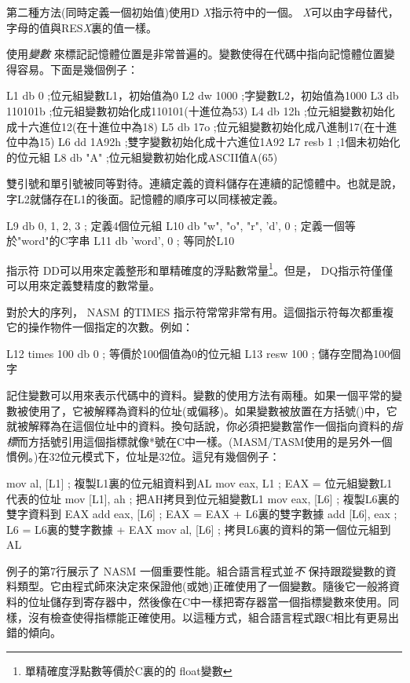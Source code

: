 第二種方法(同時定義一個初始值)使用{\code D{\em
X}}指示符中的一個。{\em
X}可以由字母替代，字母的值與{\code RES{\em X}}裏的值一樣。

使用\emph{變數}
來標記記憶體位置是非常普遍的。變數使得在代碼中指向記憶體位置變得容易。下面是幾個例子：
\begin{AsmCodeListing}[frame=none, numbers=none]
L1    db     0        ;位元組變數L1，初始值為0
L2    dw     1000     ;字變數L2，初始值為1000
L3    db     110101b  ;位元組變數初始化成110101(十進位為53)
L4    db     12h      ;位元組變數初始化成十六進位12(在十進位中為18)
L5    db     17o      ;位元組變數初始化成八進制17(在十進位中為15)
L6    dd     1A92h    ;雙字變數初始化成十六進位1A92
L7    resb   1        ;1個未初始化的位元組
L8    db     "A"      ;位元組變數初始化成ASCII值A(65)
\end{AsmCodeListing}

雙引號和單引號被同等對待。連續定義的資料儲存在連續的記憶體中。也就是說，字L2就儲存在L1的後面。記憶體的順序可以同樣被定義。
\begin{AsmCodeListing}[frame=none, numbers=none]
L9    db     0, 1, 2, 3              ; 定義4個位元組
L10   db     "w", "o", "r", 'd', 0   ; 定義一個等於"word"的C字串
L11   db     'word', 0               ; 等同於L10
\end{AsmCodeListing}

指示符{\code
DD}可以用來定義整形和單精確度的浮點數常量\footnote{單精確度浮點數等價於C裏的的{\code
float}變數}。但是，{\code
DQ}指示符僅僅可以用來定義雙精度的數常量。

對於大的序列， NASM 的{\code TIMES}
指示符常常非常有用。這個指示符每次都重複它的操作物件一個指定的次數。例如：
\begin{AsmCodeListing}[frame=none, numbers=none]
L12   times 100 db 0                 ; 等價於100個值為0的位元組
L13   resw   100                     ; 儲存空間為100個字
\end{AsmCodeListing}

記住變數可以用來表示代碼中的資料。變數的使用方法有兩種。如果一個平常的變數被使用了，它被解釋為資料的位址(或偏移)。如果變數被放置在方括號({\code
[]})中，它就被解釋為在這個位址中的資料。換句話說，你必須把變數當作一個指向資料的\emph{指標}而方括號引用這個指標就像*號在C中一樣。(MASM/TASM使用的是另外一個慣例。)在32位元模式下，位址是32位。這兒有幾個例子：
\begin{AsmCodeListing}[frame=none]
      mov    al, [L1]      ; 複製L1裏的位元組資料到AL
      mov    eax, L1       ; EAX = 位元組變數L1代表的位址
      mov    [L1], ah      ; 把AH拷貝到位元組變數L1
      mov    eax, [L6]     ; 複製L6裏的雙字資料到 EAX
      add    eax, [L6]     ; EAX = EAX + L6裏的雙字數據
      add    [L6], eax     ; L6 = L6裏的雙字數據 + EAX
      mov    al, [L6]      ; 拷貝L6裏的資料的第一個位元組到AL
\end{AsmCodeListing}
例子的第7行展示了 NASM 一個重要性能。組合語言程式並\emph{不}
保持跟蹤變數的資料類型。它由程式師來決定來保證他(或她)正確使用了一個變數。隨後它一般將資料的位址儲存到寄存器中，然後像在C中一樣把寄存器當一個指標變數來使用。同樣，沒有檢查使得指標能正確使用。以這種方式，組合語言程式跟C相比有更易出錯的傾向。

